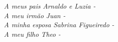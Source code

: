 \section*{\centering{ }}

\vspace{15em}

\begin{center}
\em 
A meus pais Arnaldo e Luzia -  \\
\vspace{2em}
A meu irmão Juan - \\
\vspace{2em}
A minha esposa Sabrina Figueiredo - \\
\vspace{2em}
A meu filho Theo - \\
\em
\end{center}
\newpage
